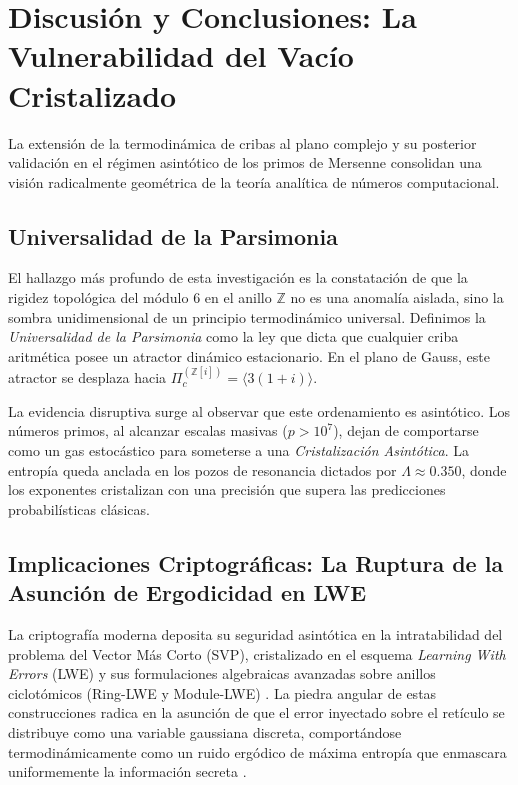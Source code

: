 \documentclass[12pt, a4paper]{article}
\theoremstyle{plain}
\theoremstyle{definition}
\theoremstyle{remark}
\newcommand{\Z}{\mathbb{Z}}
\begin{document}
\section{Discusión y Conclusiones: La Vulnerabilidad del Vacío Cristalizado}
\label{sec:discusion_conclusiones}

La extensión de la termodinámica de cribas al plano complejo y su posterior validación en el régimen asintótico de los primos de Mersenne consolidan una visión radicalmente geométrica de la teoría analítica de números computacional. 

\subsection{Universalidad de la Parsimonia}

El hallazgo más profundo de esta investigación es la constatación de que la rigidez topológica del módulo 6 en el anillo $\Z$ no es una anomalía aislada, sino la sombra unidimensional de un principio termodinámico universal. Definimos la \textit{Universalidad de la Parsimonia} como la ley que dicta que cualquier criba aritmética posee un atractor dinámico estacionario. En el plano de Gauss, este atractor se desplaza hacia $\Pi_c^{(\Z[i])} = \langle 3(1+i) \rangle$.

La evidencia disruptiva surge al observar que este ordenamiento es asintótico. Los números primos, al alcanzar escalas masivas ($p > 10^7$), dejan de comportarse como un gas estocástico para someterse a una \textit{Cristalización Asintótica}. La entropía queda anclada en los pozos de resonancia dictados por $\Lambda \approx 0.350$, donde los exponentes cristalizan con una precisión que supera las predicciones probabilísticas clásicas.

\subsection{Implicaciones Criptográficas: La Ruptura de la Asunción de Ergodicidad en LWE}

La criptografía moderna deposita su seguridad asintótica en la intratabilidad del problema del Vector Más Corto (SVP), cristalizado en el esquema \textit{Learning With Errors} (LWE) y sus formulaciones algebraicas avanzadas sobre anillos ciclotómicos (Ring-LWE y Module-LWE) \cite{Peikert2009}. La piedra angular de estas construcciones radica en la asunción de que el error inyectado sobre el retículo se distribuye como una variable gaussiana discreta, comportándose termodinámicamente como un ruido ergódico de máxima entropía que enmascara uniformemente la información secreta \cite{Regev2009}.
\end{document}
